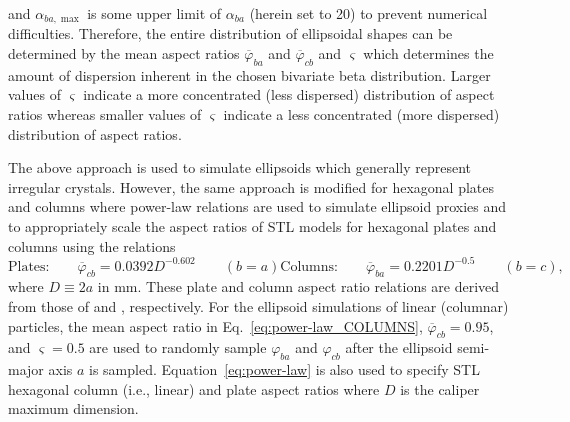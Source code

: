 \documentclass[amt, manuscript]{copernicus}
\begin{document}
and $\alpha_{ba,\max}$ is some upper limit of $\alpha_{ba}$ (herein set to 20) to prevent numerical difficulties. Therefore, the entire distribution of ellipsoidal shapes can be determined by the mean aspect ratios $\overline{\varphi}_{ba}$ and $\overline{\varphi}_{cb}$ and $\varsigma$ which determines the amount of dispersion inherent in the chosen bivariate beta distribution. Larger values of $\varsigma$ indicate a more concentrated (less dispersed) distribution of aspect ratios whereas smaller values of $\varsigma$ indicate a less concentrated (more dispersed) distribution of aspect ratios.

The above approach is used to simulate ellipsoids which generally represent irregular crystals. However, the same approach is modified for hexagonal plates and columns where power-law relations are used to simulate ellipsoid proxies and to appropriately scale the aspect ratios of STL models for  hexagonal plates and columns using the relations
\begin{subequations}\label{eq:power-law}
\begin{equation}\label{eq:power-law_PLATES}
\textrm{Plates:} \qquad \overline{\varphi}_{cb} = 0.0392 D^{-0.602} \qquad (b=a)
\end{equation} 
\begin{equation}\label{eq:power-law_COLUMNS}
 \textrm{Columns:} \qquad \overline{\varphi}_{ba} = 0.2201 D^{-0.5} \qquad (b=c),
\end{equation}
\end{subequations}
where $D\equiv 2 a$ in mm. These plate and column aspect ratio relations are derived from those of \citet{Auer1970} and \citet{Mitchell1994a}, respectively. For the ellipsoid simulations of linear (columnar) particles, the mean aspect ratio in Eq.~\ref{eq:power-law_COLUMNS}, $\overline{\varphi}_{cb}=0.95$, and $\varsigma=0.5$ are used to randomly sample $\varphi_{ba}$ and $\varphi_{cb}$ after the ellipsoid semi-major axis $a$ is sampled. Equation~\ref{eq:power-law} is also used to specify STL hexagonal column (i.e., linear) and plate aspect ratios where $D$ is the caliper maximum dimension.

\end{document}
